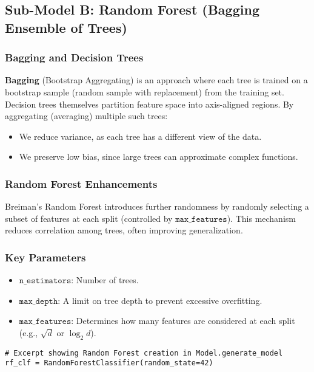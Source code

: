 \documentclass[12pt]{article}
\begin{document}
\subsection{Sub-Model B: Random Forest (Bagging Ensemble of Trees)}

\subsubsection{Bagging and Decision Trees}
\textbf{Bagging} (Bootstrap Aggregating) is an approach where each tree is trained on a bootstrap sample (random sample with replacement) from the training set. Decision trees themselves partition feature space into axis-aligned regions. By aggregating (averaging) multiple such trees:
\begin{itemize}[noitemsep]
    \item We reduce variance, as each tree has a different view of the data.
    \item We preserve low bias, since large trees can approximate complex functions.
\end{itemize}

\subsubsection{Random Forest Enhancements}
Breiman’s Random Forest \cite{breiman2001random} introduces further randomness by randomly selecting a subset of features at each split (controlled by \(\texttt{max\_features}\)). This mechanism reduces correlation among trees, often improving generalization.

\subsubsection{Key Parameters}
\begin{itemize}[noitemsep]
    \item \(\texttt{n\_estimators}\): Number of trees.
    \item \(\texttt{max\_depth}\): A limit on tree depth to prevent excessive overfitting.
    \item \(\texttt{max\_features}\): Determines how many features are considered at each split (e.g., \(\sqrt{d}\) or \(\log_2 d\)).
\end{itemize}

\begin{verbatim}
# Excerpt showing Random Forest creation in Model.generate_model
rf_clf = RandomForestClassifier(random_state=42)
\end{verbatim}
\end{document}
